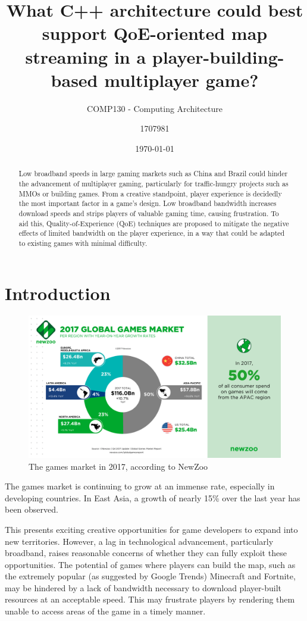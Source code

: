 \documentclass{scrartcl}
\title{What C++ architecture could best support QoE-oriented map streaming in a player-building-based multiplayer game?}
\subtitle{COMP130 - Computing Architecture}
\date{\today}
\author{1707981}
\begin{document}
\maketitle
{}

\begin{abstract}
Low broadband speeds in large gaming markets such as China and Brazil could hinder the advancement of multiplayer gaming, particularly for traffic-hungry projects such as MMOs or building games. From a creative standpoint, player experience is decidedly the most important factor in a game's design. Low broadband bandwidth increases download speeds and strips players of valuable gaming time, causing frustration. To aid this, Quality-of-Experience (QoE) techniques are proposed to mitigate the negative effects of limited bandwidth on the player experience, in a way that could be adapted to existing games with minimal difficulty.
\end{abstract}

\section{Introduction}
\begin{figure}
\includegraphics[width=0.75\linewidth]{Newzoo_2017_Global_Games_Market.png}
\caption{The games market in 2017, according to NewZoo}
\label{fig:market}
\end{figure}
The games market is continuing to grow at an immense rate, especially in developing countries. In East Asia, a growth of nearly 15\% over the last year has been observed.\cite{fig:market}

This presents exciting creative opportunities for game developers to expand into new territories. However, a lag in technological advancement, particularly broadband, raises reasonable concerns of whether they can fully exploit these opportunities. The potential of games where players can build the map, such as the extremely popular (as suggested by Google Trends\cite{minecraftnite}) Minecraft and Fortnite, may be hindered by a lack of bandwidth necessary to download player-built resources at an acceptable speed. This may frustrate players by rendering them unable to access areas of the game in a timely manner.
\end{document}
